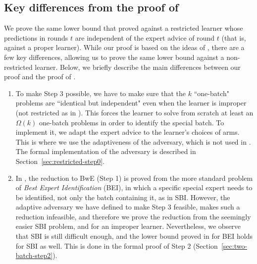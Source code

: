 \documentclass[a4paper,11pt]{article}
\theoremstyle{definition}
\newcommand{\eps}{\varepsilon}
\begin{document}

\subsection{Key differences from the proof of \cite{ito2024minimax}} \label{sec:proof-differences}
We prove the same lower bound that \cite{ito2024minimax} proved against a restricted learner whose predictions in rounds $t$ are independent of the expert advice of round $t$ (that is, against a proper learner). While our proof is based on the ideas of \cite{ito2024minimax}, there are a few key differences, allowing us to prove the same lower bound against a non-restricted learner. Below, we briefly describe the main differences between our proof and the proof of \cite{ito2024minimax}.
\begin{enumerate}
    \item To make Step 3 possible, we have to make sure that the $k$ ``one-batch" problems are ``identical but independent" even when the learner is improper (not restricted as in \cite{ito2024minimax}). This forces the learner to solve from scratch at least an $\Omega(k)$ one-batch problems in order to identify the special batch. To implement it, we adapt the expert advice to the learner's choices of arms. This is where we use the adaptiveness of the adversary, which is not used in \cite{ito2024minimax}. The formal implementation of the adversary is described in Section~\ref{sec:restricted-step0}. 
    \item In \cite{ito2024minimax}, the reduction to BwE (Step 1) is proved from the more standard problem of \emph{Best Expert Identification} (BEI), in which a specific special expert needs to be identified, not only the batch containing it, as in SBI. However, the adaptive adversary we have defined to make Step 3 feasible, makes such a reduction infeasible, and therefore we prove the reduction from the seemingly easier SBI problem, and for an improper learner. Nevertheless, we observe that SBI is still difficult enough, and the lower bound proved in \cite{ito2024minimax} for BEI holds for SBI as well. This is done in the formal proof of Step 2 (Section~\ref{sec:two-batch-step2}).
\end{enumerate}
\end{document}
